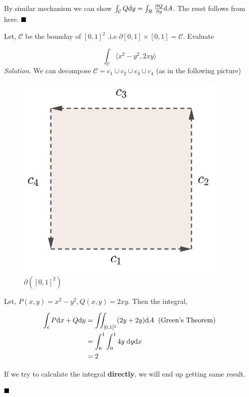 \documentclass[../Analysis-3]{subfiles}
\begin{document}
By similar mechanism we can show $\int_{\mathcal{C}} Q \dd y = \int_{\mathcal{R}} \pdv{Q}{y} \dd A$. The resst follows from here. $\hfill \blacksquare$
\pagebreak
\begin{Eg}{}{}
    Let, $\mathcal{C}$ be the bounday of $[0,1]^2$ .i.e $\partial [0,1]\times[0,1] = \mathcal{C}$. Evaluate

    \[\int_{\mathcal{C}} \langle x^2-y^2,2xy \rangle\]
    \textit{Solution.} We can decompose $\mathcal{C} = c_1 \cup c_2 \cup c_3 \cup c_4$ (as in the following picture)

    \begin{figure}
        \centering
        \includegraphics[width=.78\linewidth]{../figures/lec-28.2.png}
        \caption{$\partial( [0,1]^2)$}
    \end{figure}

    Let, $P(x,y) = x^2 - y^2, Q(x,y) = 2xy$. Then the integral,

    \begin{align*}
        \int_c P \dd x + Q \dd y & = \iint_{[0,1]^2} (2y + 2y) \dd A \hspace{0.2cm} \text{(Green's Theorem)} \\
                                 & = \int_{0}^1 \int_0^1 4y \hspace{0.1cm} \dd y \dd x                       \\
                                 & = 2
    \end{align*}

    If we try to calculate the integral \textbf{directly}, we will end up getting same result.

    $\hfill \blacksquare$
\end{Eg}
\end{document}
